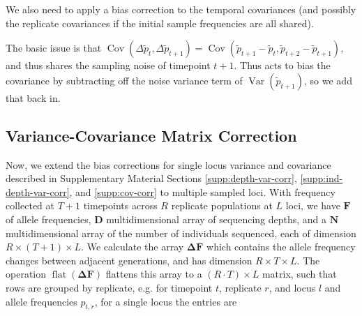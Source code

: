 \documentclass[11pt]{article}
\DeclareMathOperator{\var}{Var}
\DeclareMathOperator{\cov}{Cov}
\DeclareMathOperator{\flt}{\mathrm{flat}}
\begin{document}
We also need to apply a bias correction to the temporal covariances (and
possibly the replicate covariances if the initial sample frequencies are all
shared).

The basic issue is that $\cov(\Delta \widetilde{p}_t, \Delta
\widetilde{p}_{t+1}) = \cov(\widetilde{p}_{t+1} - \widetilde{p}_t,
\widetilde{p}_{t+2} - \widetilde{p}_{t+1})$, and thus shares the sampling noise
of timepoint $t+1$. Thus acts to bias the covariance by subtracting off the
noise variance term of $\var(\widetilde{p}_{t+1})$, so we add that back in.

\subsection{Variance-Covariance Matrix Correction}
\label{supp:matrix-correction}

Now, we extend the bias corrections for single locus variance and covariance
described in Supplementary Material Sections \ref{supp:depth-var-corr},
\ref{supp:ind-depth-var-corr}, and \ref{supp:cov-corr} to multiple sampled
loci. With frequency collected at $T+1$ timepoints across $R$ replicate
populations at $L$ loci, we have $\mathbf{F}$ of allele frequencies,
$\mathbf{D}$ multidimensional array of sequencing depths, and a $\mathbf{N}$
multidimensional array of the number of individuals sequenced, each of
dimension $R \times (T+1) \times L$.  We calculate the array $\mathbf{\Delta
F}$ which contains the allele frequency changes between adjacent generations,
and has dimension $R \times T \times L$.  The operation
$\flt(\mathbf{\Delta}\mathbf{F})$ flattens this array to a $(R \cdot T) \times
L$ matrix, such that rows are grouped by replicate, e.g. for timepoint $t$,
replicate $r$, and locus $l$ and allele frequencies $p_{t, r}$, for a single
locus the entries are 

\end{document}
